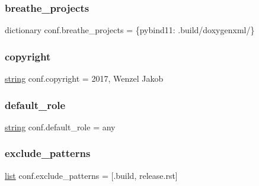 \mbox{\label{namespaceconf_acb47d2c0c2904fa7d36b63142533f383}} 
\subsubsection{\texorpdfstring{breathe\_projects}{breathe\_projects}}
{\footnotesize\ttfamily dictionary conf.\+breathe\+\_\+projects = \{\textquotesingle{}pybind11\textquotesingle{}\+: \textquotesingle{}.build/doxygenxml/\textquotesingle{}\}}

\mbox{\label{namespaceconf_a33fa97cf51dcb25970fbf53f10159589}} 
\subsubsection{\texorpdfstring{copyright}{copyright}}
{\footnotesize\ttfamily \mbox{\hyperlink{asdl_8h_ae84541b4f3d8e1ea24ec0f466a8c568b}{string}} conf.\+copyright = \textquotesingle{}2017, Wenzel Jakob\textquotesingle{}}

\mbox{\label{namespaceconf_a038ead0be6737e911aede67886fcedca}} 
\subsubsection{\texorpdfstring{default\_role}{default\_role}}
{\footnotesize\ttfamily \mbox{\hyperlink{asdl_8h_ae84541b4f3d8e1ea24ec0f466a8c568b}{string}} conf.\+default\+\_\+role = \textquotesingle{}any\textquotesingle{}}

\mbox{\label{namespaceconf_a7ad48fb6f3e9b129c02346ea0d3527c1}} 
\subsubsection{\texorpdfstring{exclude\_patterns}{exclude\_patterns}}
{\footnotesize\ttfamily \mbox{\hyperlink{classlist}{list}} conf.\+exclude\+\_\+patterns = \mbox{[}\textquotesingle{}.build\textquotesingle{}, \textquotesingle{}release.\+rst\textquotesingle{}\mbox{]}}

